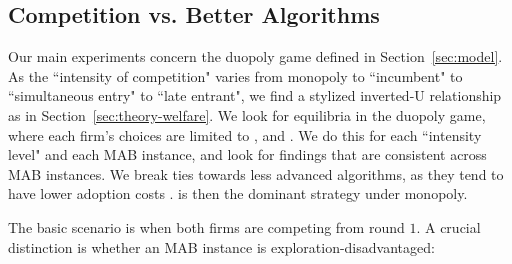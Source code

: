 \documentclass[../competing_bandits_with_appendix.tex]{subfiles}
\begin{document}
\subsection{Competition vs. Better Algorithms}\label{sec:competition}

Our main experiments concern the duopoly game defined in Section~\ref{sec:model}. As the ``intensity of competition" varies from  monopoly to ``incumbent" to ``simultaneous entry" to ``late entrant", we find a stylized inverted-U relationship as in Section~\ref{sec:theory-welfare}. We look for equilibria in the duopoly game, where each firm's choices are limited to \DynamicGreedy, \DynamicEpsGreedy and \Thompson. We do this for each ``intensity level" and each MAB instance, and look for findings that are consistent across MAB instances. 
We break ties towards less advanced algorithms, as they tend to have lower adoption costs \citep{DS-arxiv}. \DynamicGreedy is then the dominant strategy under monopoly.


The basic scenario is when both firms are competing from round $1$. A crucial distinction is whether an MAB instance is exploration-disadvantaged:

\end{document}

